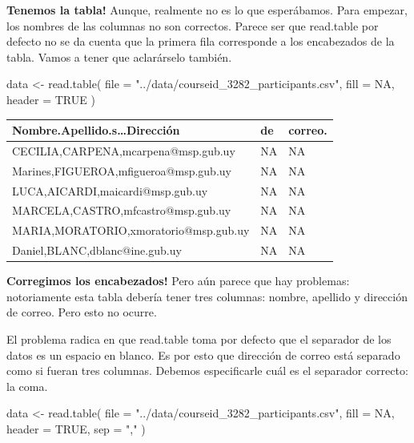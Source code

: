 \documentclass[
  letterpaper,
  DIV=11,
  numbers=noendperiod]{scrreprt}
\newenvironment{Shaded}{\begin{snugshade}}{\end{snugshade}}
\newcommand{\AttributeTok}[1]{\textcolor[rgb]{0.40,0.45,0.13}{#1}}
\newcommand{\ConstantTok}[1]{\textcolor[rgb]{0.56,0.35,0.01}{#1}}
\newcommand{\FunctionTok}[1]{\textcolor[rgb]{0.28,0.35,0.67}{#1}}
\newcommand{\NormalTok}[1]{\textcolor[rgb]{0.00,0.23,0.31}{#1}}
\newcommand{\OtherTok}[1]{\textcolor[rgb]{0.00,0.23,0.31}{#1}}
\newcommand{\StringTok}[1]{\textcolor[rgb]{0.13,0.47,0.30}{#1}}
\begin{document}
\textbf{Tenemos la tabla!} Aunque, realmente no es lo que esperábamos.
Para empezar, los nombres de las columnas no son correctos. Parece ser
que read.table por defecto no se da cuenta que la primera fila
corresponde a los encabezados de la tabla. Vamos a tener que aclarárselo
también.

\begin{Shaded}
\begin{Highlighting}[]
\NormalTok{data }\OtherTok{\textless{}{-}} \FunctionTok{read.table}\NormalTok{(}
  \AttributeTok{file =} \StringTok{"../data/courseid\_3282\_participants.csv"}\NormalTok{, }
  \AttributeTok{fill =} \ConstantTok{NA}\NormalTok{,}
  \AttributeTok{header =} \ConstantTok{TRUE}
\NormalTok{)}
\end{Highlighting}
\end{Shaded}

\begin{longtable}[]{@{}lll@{}}
\toprule()
Nombre.Apellido.s\ldots Dirección & de & correo. \\
\midrule()
\endhead
CECILIA,CARPENA,mcarpena@msp.gub.uy & NA & NA \\
Marines,FIGUEROA,mfigueroa@msp.gub.uy & NA & NA \\
LUCA,AICARDI,maicardi@msp.gub.uy & NA & NA \\
MARCELA,CASTRO,mfcastro@msp.gub.uy & NA & NA \\
MARIA,MORATORIO,xmoratorio@msp.gub.uy & NA & NA \\
Daniel,BLANC,dblanc@ine.gub.uy & NA & NA \\
\bottomrule()
\end{longtable}

\textbf{Corregimos los encabezados!} Pero aún parece que hay problemas:
notoriamente esta tabla debería tener tres columnas: nombre, apellido y
dirección de correo. Pero esto no ocurre.

El problema radica en que read.table toma por defecto que el separador
de los datos es un espacio en blanco. Es por esto que dirección de
correo está separado como si fueran tres columnas. Debemos especificarle
cuál es el separador correcto: la coma.

\begin{Shaded}
\begin{Highlighting}[]
\NormalTok{data }\OtherTok{\textless{}{-}} \FunctionTok{read.table}\NormalTok{(}
  \AttributeTok{file =} \StringTok{"../data/courseid\_3282\_participants.csv"}\NormalTok{, }
  \AttributeTok{fill =} \ConstantTok{NA}\NormalTok{,}
  \AttributeTok{header =} \ConstantTok{TRUE}\NormalTok{,}
  \AttributeTok{sep =} \StringTok{","}
\NormalTok{)}
\end{Highlighting}
\end{Shaded}
\end{document}
